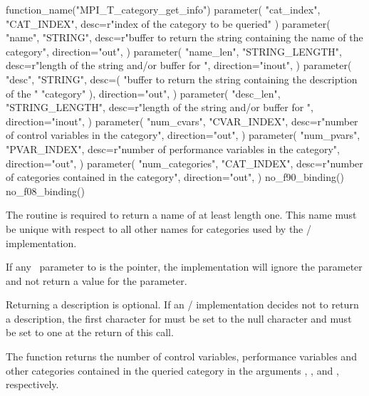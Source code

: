 \begin{mpi-binding}
    function_name("MPI_T_category_get_info")
    parameter(
        "cat_index", "CAT_INDEX", desc=r"index of the category to be queried"
    )
    parameter(
        "name",
        "STRING",
        desc=r"buffer to return the string containing the name of the category",
        direction="out",
    )
    parameter(
        "name_len",
        "STRING_LENGTH",
        desc=r"length of the string and/or buffer for ",
        direction="inout",
    )
    parameter(
        "desc",
        "STRING",
        desc=(
            "buffer to return the string containing the description of the "
            "category"
        ),
        direction="out",
    )
    parameter(
        "desc_len",
        "STRING_LENGTH",
        desc=r"length of the string and/or buffer for ",
        direction="inout",
    )
    parameter(
        "num_cvars",
        "CVAR_INDEX",
        desc=r"number of control variables in the category",
        direction="out",
    )
    parameter(
        "num_pvars",
        "PVAR_INDEX",
        desc=r"number of performance variables in the category",
        direction="out",
    )
    parameter(
        "num_categories",
        "CAT_INDEX",
        desc=r"number of  categories contained in the category",
        direction="out",
    )
    no_f90_binding()
    no_f08_binding()
\end{mpi-binding}


The routine is required to return a name of at least length one.  This name
must be unique with respect to all other names for categories used by the
\MPI/ implementation.

If any \OUT\ parameter to  is the
 pointer, the implementation will ignore the parameter and not
return a value for the parameter.



Returning a description is optional.  If an \mpi/ implementation decides
not to return a description, the first character for  must be
set to the null character and  must be set to one at the
return of this call.

The function returns the number of control variables, performance variables
and other categories contained in the queried category in the arguments
, , and ,
respectively.

